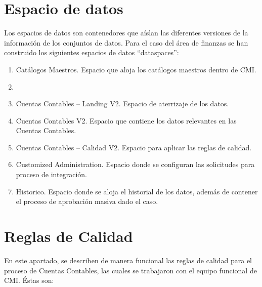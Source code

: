 \section{Espacio de datos}

Los espacios de datos son contenedores que aíslan las diferentes versiones de la información de los conjuntos de datos. Para el caso del área de finanzas se han construido los siguientes espacios de datos “dataspaces”:

\begin{enumerate}
    \item [CA] Catálogos Maestros. Espacio que aloja los catálogos maestros dentro de CMI. 
    \item 
    \item [CuCo] Cuentas Contables – Landing V2.  Espacio de aterrizaje de los datos. 
    
    \item [CuCo] Cuentas Contables V2. Espacio que contiene los datos relevantes en las Cuentas Contables.
    
    \item [CuCo] Cuentas Contables – Calidad V2.  Espacio para aplicar las reglas de calidad. 
    
    \item [CA] Customized Administration. Espacio donde se configuran las solicitudes para proceso de integración.
    
    \item Historico. Espacio donde se aloja el historial de los datos, además de contener el proceso de aprobación masiva dado el caso. 

\end{enumerate}


\section{Reglas de Calidad}

En este apartado, se describen de manera funcional las reglas de calidad para el proceso de Cuentas Contables, las cuales se trabajaron con el equipo funcional de CMI. Éstas son:

